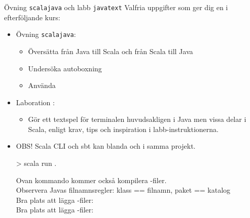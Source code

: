 



\begin{Slide}{Övning \texttt{scalajava} och labb \texttt{javatext}}\SlideFontSmall
Valfria uppgifter som ger dig en  i efterföljande kurs:
\begin{itemize}
\item Övning \texttt{scalajava}:
\begin{itemize}\SlideFontTiny
\item Översätta från Java till Scala och från Scala till Java
\item Undersöka autoboxning 
\item Använda 
\end{itemize}
\item Laboration :
\begin{itemize}\SlideFontTiny
  \item Gör ett textspel för terminalen huvudsakligen i Java men vissa delar i Scala, enligt krav, tips och inspiration i labb-instruktionerna.

\end{itemize}
\item OBS! Scala CLI och sbt kan blanda  och  i samma projekt.
\begin{REPLnonum}
> scala run .
\end{REPLnonum}
Ovan kommando kommer också kompilera -filer.
\\Observera Javas filnamnsregler: klass == filnamn, paket == katalog
\\ Bra plats att lägga -filer: \hfill{} 
\\ Bra plats att lägga -filer: \hfill{} 
\end{itemize}
\end{Slide}



